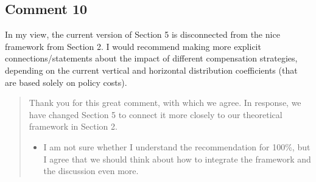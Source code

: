 \documentclass[11pt]{article}
\newenvironment{response}
{\begin{quote}\color{black}}
{\end{quote}}
\begin{document}
\subsection*{Comment 10}\label{comment_R2_10}

\begin{commentbox}
    In my view, the current version of Section 5 is disconnected from the nice framework from Section 2. I would recommend making more explicit connections/statements about the impact of different compensation strategies, depending on the current vertical and horizontal distribution coefficients (that are based solely on policy costs).
\end{commentbox}

\begin{response}
    Thank you for this great comment, with which we agree. In response, we have changed Section 5 to connect it more closely to our theoretical framework in Section 2.
    \begin{itemize}
        \item I am not sure whether I understand the recommendation for 100\%, but I agree that we should think about how to integrate the framework and the discussion even more.
    \end{itemize}
\end{response}

\clearpage

\clearpage
\end{document}
